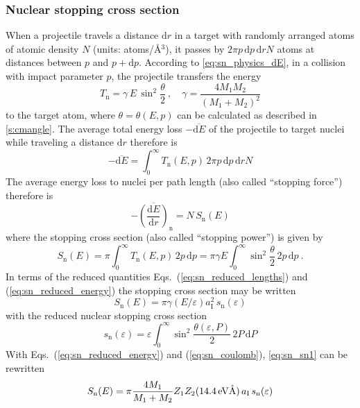 
\subsubsection{Nuclear stopping cross section}
%
When a projectile travels a distance $\mathrm{d} r$ in a target with randomly arranged atoms of atomic density $N$ (units: atoms/\AA$^3$), it passes by $2 \pi p \, \mathrm{d} p \, \mathrm{d} r N$ atoms at distances between $p$ and $p + \mathrm{d} p$. According to \cref{eq:sn_physics_dE}, in a collision with impact parameter $p$, the projectile transfers the energy
%
\begin{equation}
    \label{eq:sn_sn_dE}
    T_\mathrm{n} = \gamma \, E \, \sin^2 \frac{\theta}{2} ~, \quad
    \gamma = \frac{ 4 M_1 M_2 }{ (M_1 + M_2)^2 }
\end{equation}
%
to the target atom, where $\theta = \theta(E, p)$ can be calculated as described in \cref{s:cmangle}. The average total energy loss $- \overline{\mathrm{d} E}$ of the projectile to target nuclei while traveling a distance $\mathrm{d} r$ therefore is
%
\begin{equation}
    - \overline{\mathrm{d} E} = \int_0^\infty T_\mathrm{n}(E,p) \,
        2 \pi p \, \mathrm{d} p \, \mathrm{d} r N
\end{equation}
%
The average energy loss to nuclei per path length (also called ``stopping force'') therefore is
%
\begin{equation}
    \label{eq:sn_sndef}
    - \overline{\left( \frac{ \mathrm{d} E }{ \mathrm{d} r } \right)}_\mathrm{n} =
        N \, S_\mathrm{n}(E)
\end{equation}
%
where the stopping cross section (also called ``stopping power'') is given by
%
\begin{equation}
    S_\mathrm{n}(E) = \pi \int_0^\infty T_\mathrm{n}(E,p) \, 2p \, \mathrm{d} p =
        \pi \gamma E \int_0^\infty \sin^2 \frac{\theta}{2} \, 2p \, \mathrm{d} p ~.
\end{equation}
%
In terms of the reduced quantities Eqs.~(\ref{eq:sn_reduced_lengths}) and (\ref{eq:sn_reduced_energy}) the stopping cross section may be written
%
\begin{equation}
    \label{eq:sn_sn1}
    S_\mathrm{n}(E) = \pi \gamma (E/\varepsilon) a_\mathrm{I}^2 \, s_\mathrm{n}(\varepsilon)
\end{equation}
%
with the reduced nuclear stopping cross section
%
\begin{equation}
    s_\mathrm{n}(\varepsilon) = \varepsilon \int_0^\infty \sin^2 \frac{\theta(\varepsilon,P)}{2} \, 2 P \, \mathrm{d} P
\end{equation}
%
With Eqs.~(\ref{eq:sn_reduced_energy}) and (\ref{eq:sn_coulomb}), \cref{eq:sn_sn1} can be rewritten
%
\begin{equation}
    \label{eq:sn_sn}
    S_\mathrm{n}(E) =  \pi \frac{ 4 M_1 }{ M_1 + M_2 } Z_1 Z_2 (14.4 \,\mathrm{eV\mathring{\mathrm{A}}}) \, a_\mathrm{I} \, s_\mathrm{n}(\varepsilon)
\end{equation}

